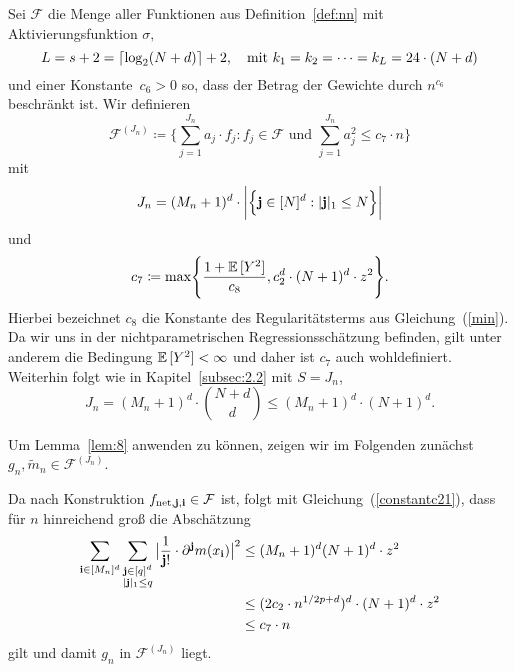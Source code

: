 Sei $\mathcal{F}$ die Menge aller Funktionen aus Definition~\ref{def:nn} mit Aktivierungsfunktion $\sigma,$ $$L = s + 2 = \lceil\log_2(N + d)\rceil + 2, \text{\quad mit } k_1 = k_2 = \cdots = k_L = 24 \cdot (N + d)$$ und einer Konstante~$c_6 > 0$ so, dass der Betrag der Gewichte durch $n^{c_{6}}$ beschränkt ist. Wir definieren
$$ \mathcal{F}^{(J_n)} \coloneqq \biggl\{\sum_{j = 1}^{J_n} a_j \cdot f_j : f_j \in \mathcal{F} \text{ und } \sum_{j = 1}^{J_n} a_j^2 \leq c_7 \cdot n \biggr\}$$
mit 
$$
J_n = (M_n + 1)^d \cdot \bigg|\Bigl\{\mathbf{j} \in [N]^d : |\mathbf{j}|_1 \leq N \Bigr\}\bigg|$$
und
\begin{equation}
\label{constantc21}
\begin{split}
c_7 \coloneqq \max\Biggl\{\frac{1 + \mathbb{E}\,[Y^2]}{c_8}, c_2^d \cdot (N + 1)^d \cdot z^2\Biggr\}.
\end{split}
\end{equation}
Hierbei bezeichnet $c_8$ die Konstante des Regularitätsterms aus Gleichung~(\ref{min}). Da wir uns in der nichtparametrischen Regressionsschätzung befinden, gilt unter anderem die Bedingung $\mathbb{E}\,[Y^2] < \infty$ und daher ist $c_7$ auch wohldefiniert. 
Weiterhin folgt wie in Kapitel~\ref{subsec:2.2} mit $S = J_n$,
\begin{equation}
\label{jn}
J_n =  (M_n + 1)^d \cdot \binom{N + d}{d} \leq (M_n + 1)^d \cdot (N + 1)^d.
\end{equation}

Um Lemma~\ref{lem:8} anwenden zu können, zeigen wir im Folgenden zunächst $g_n, \tilde{m}_n \in \mathcal{F}^{(J_n)}.$

Da nach Konstruktion $f_{\mathrm{net},\mathbf{j},\mathbf{i}} \in \mathcal{F}$ ist, folgt mit Gleichung~(\ref{constantc21}), dass für $n$ hinreichend groß die Abschätzung
\begin{equation*}
\begin{split}
\sum_{\mathbf{i} \in [M_n]^d} \sum_{\substack{ \mathbf{j} \in [q]^d \\ |\mathbf{j}|_1 \leq q}} \big| \frac{1}{\mathbf{j}!} \cdot \partial^{\mathbf{j}}m(x_{\mathbf{i}})\big|^2 & \leq (M_n + 1)^d (N + 1)^d \cdot z^2 \\
& \leq (2 c_2 \cdot n^{1/2p + d})^d \cdot (N + 1)^d \cdot z^2 \\
& \leq c_7 \cdot n
\end{split}
\end{equation*}
gilt und damit $g_n$ in $\mathcal{F}^{(J_n)}$ liegt. 

